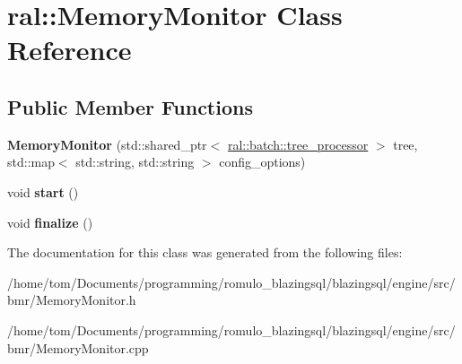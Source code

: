 \hypertarget{classral_1_1MemoryMonitor}{}\section{ral\+:\+:Memory\+Monitor Class Reference}
\label{classral_1_1MemoryMonitor}
\subsection*{Public Member Functions}
\begin{DoxyCompactItemize}
\item 
\mbox{\label{classral_1_1MemoryMonitor_a7751a3124ab3609363953f5be0022237}} 
{\bfseries Memory\+Monitor} (std\+::shared\+\_\+ptr$<$ \hyperlink{structral_1_1batch_1_1tree__processor}{ral\+::batch\+::tree\+\_\+processor} $>$ tree, std\+::map$<$ std\+::string, std\+::string $>$ config\+\_\+options)
\item 
\mbox{\label{classral_1_1MemoryMonitor_a12841f5c5f84ae84d7d98aef03a0d1a1}} 
void {\bfseries start} ()
\item 
\mbox{\label{classral_1_1MemoryMonitor_a6a851dc6a51fb75e8e954c5b17d78aa8}} 
void {\bfseries finalize} ()
\end{DoxyCompactItemize}


The documentation for this class was generated from the following files\+:\begin{DoxyCompactItemize}
\item 
/home/tom/\+Documents/programming/romulo\+\_\+blazingsql/blazingsql/engine/src/bmr/Memory\+Monitor.\+h\item 
/home/tom/\+Documents/programming/romulo\+\_\+blazingsql/blazingsql/engine/src/bmr/Memory\+Monitor.\+cpp\end{DoxyCompactItemize}
